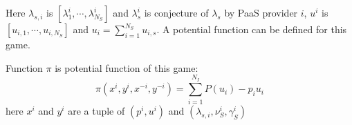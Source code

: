 \documentclass[conference]{IEEEtran}
\begin{document}
    Here $\lambda_{s,i}$ is $[\lambda^i_1, \cdots, \lambda^i_{N_S}]$ and $\lambda^i_s$ is conjecture of $\lambda_s$ by PaaS provider $i$, $u^i$ is $[u_{i,1}, \cdots, u_{i,N_S}]$ and $u_i = \sum_{i=1}^{N_S}u_{i,s}$.
    A potential function can be defined for this game.

    Function $\pi$ is potential function of this game:
    \begin{equation}
      \pi(x^i, y^i,x^{-i}, y^{-i})=\sum_{i=1}^{N_I} P(u_i) - p_i u_i
    \end{equation}
    here $x^i$ and $y^i$ are a tuple of $(p^i,u^i)$ and  $(\lambda_{s,i},\nu_S^i,\gamma_S^i)$

    
    
\end{document}
